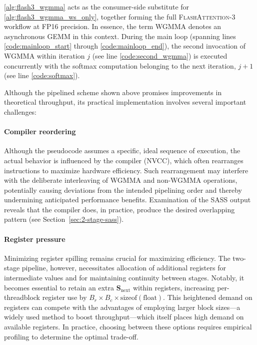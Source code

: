 \begin{enumerate}
\begin{algorithm}[H]
\begin{algorithmic}[1]
\cref{alg:flash3_wgmma} acts as the consumer-side substitute for \cref{alg:flash3_wgmma_ws_only}, together forming the full \textsc{FlashAttention-3} workflow at FP16 precision. In essence, the term WGMMA denotes an asynchronous GEMM in this context. During the main loop (spanning lines \ref{code:mainloop_start} through \ref{code:mainloop_end}), the second invocation of WGMMA within iteration $j$ (see line \ref{code:second_wgmma}) is executed concurrently with the softmax computation belonging to the next iteration, $j+1$ (see line \ref{code:softmax}).

Although the pipelined scheme shown above promises improvements in theoretical throughput, its practical implementation involves several important challenges:

\paragraph{Compiler reordering} Although the pseudocode assumes a specific, ideal sequence of execution, the actual behavior is influenced by the compiler (NVCC), which often rearranges instructions to maximize hardware efficiency. Such rearrangement may interfere with the deliberate interleaving of WGMMA and non-WGMMA operations, potentially causing deviations from the intended pipelining order and thereby undermining anticipated performance benefits. Examination of the SASS output reveals that the compiler does, in practice, produce the desired overlapping pattern (see Section~\ref{sec:2-stage-sass}).

\paragraph{Register pressure} Minimizing register spilling remains crucial for maximizing efficiency. The two-stage pipeline, however, necessitates allocation of additional registers for intermediate values and for maintaining continuity between stages. Notably, it becomes essential to retain an extra $\mathbf{S}_{\mathrm{next}}$ within registers, increasing per-threadblock register use by $B_r \times B_c \times \text{sizeof}(\text{float})$. This heightened demand on registers can compete with the advantages of employing larger block sizes—a widely used method to boost throughput—which itself places high demand on available registers. In practice, choosing between these options requires empirical profiling to determine the optimal trade-off.


\end{algorithmic}
\end{algorithm}
\end{enumerate}
